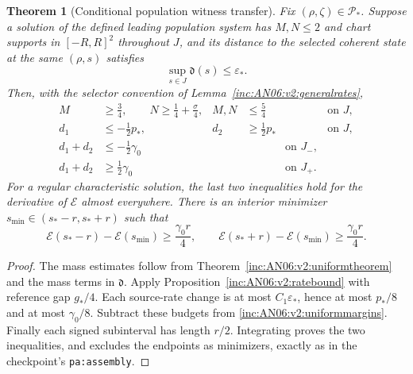 \documentclass[11pt]{article}
\numberwithin{equation}{section}
\newtheorem{theorem}{Theorem}[section]
\theoremstyle{remark}\newtheorem{remark}[theorem]{Remark}
\newcommand{\1}{\mathbf 1}
\begin{document}
\begin{theorem}[Conditional population witness transfer]
\label{inc:AN06:v2:populationtransfer}
Fix $(\rho,\zeta)\in\mathcal P_*$. Suppose a solution of the defined
leading population system has $M,N\le2$ and chart supports in $[-R,R]^2$
throughout $J$, and its distance to the selected coherent state at the
same $(\rho,s)$ satisfies
\begin{equation}\label{inc:AN06:v2:tolerancecondition}
 \sup_{s\in J}\mathfrak d(s)\le\varepsilon_*.
\end{equation}
Then, with the selector convention of
Lemma~\ref{inc:AN06:v2:generalrates},
\begin{align}
 M&\ge\tfrac34,\qquad N\ge\tfrac14+\tfrac\sigma4,
 &M,N&\le\tfrac54 &&\text{on }J,\nonumber\\
 d_1&\le-\tfrac12p_*,&d_2&\ge\tfrac12p_* &&\text{on }J,
 \label{inc:AN06:v2:populationmargins}\\
 d_1+d_2&\le-\tfrac12\gamma_0&&&\text{on }J_-,\nonumber\\
 d_1+d_2&\ge\tfrac12\gamma_0&&&\text{on }J_+.\nonumber
\end{align}
For a regular characteristic solution, the last two inequalities hold
for the derivative of $\mathcal E$ almost everywhere. There is an
interior minimizer $s_{\min}\in(s_*-r,s_*+r)$ such that
\begin{equation}\label{inc:AN06:v2:rebound}
 \mathcal E(s_*-r)-\mathcal E(s_{\min})\ge\frac{\gamma_0r}{4},\qquad
 \mathcal E(s_*+r)-\mathcal E(s_{\min})\ge\frac{\gamma_0r}{4}.
\end{equation}
\end{theorem}
\begin{proof}
The mass estimates follow from Theorem~\ref{inc:AN06:v2:uniformtheorem}
and the mass terms in $\mathfrak d$.
Apply Proposition~\ref{inc:AN06:v2:ratebound} with reference gap $g_*/4$.
Each source-rate change is at most $C_1\varepsilon_*$, hence at most
$p_*/8$ and at most $\gamma_0/8$. Subtract these budgets from
\eqref{inc:AN06:v2:uniformmargins}. Finally each signed subinterval has
length $r/2$. Integrating proves the two inequalities, and excludes the
endpoints as minimizers, exactly as in the checkpoint's
\texttt{pa:assembly}.
\end{proof}
\end{document}
